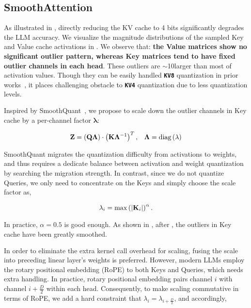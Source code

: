 \subsection{SmoothAttention}
\label{sect:alg:smooth-attention}

As illustrated in , directly reducing the KV cache to 4 bits significantly degrades the LLM accuracy. We visualize the magnitude distributions of the sampled Key and Value cache activations in . We observe that: \textbf{the Value matrices show no significant outlier pattern, whereas Key matrices tend to have fixed outlier channels in each head}. These outliers are  $\sim$10\x larger than most of activation values. Though they can be easily handled \textbf{\texttt{KV8}} quantization in prior works~\cite{xiao2023smoothquant}, it places challenging obstacle to \textbf{\texttt{KV4}} quantization due to less quantization levels.

Inspired by SmoothQuant~\cite{xiao2023smoothquant}, we propose \smoothattention to scale down the outlier channels in Key cache by a per-channel factor $\mathbf{\lambda}$:

\vspace{-10pt}
\begin{equation}
    \small \mathbf{Z} = \left(\mathbf{Q}\mathbf{\Lambda}\right)\cdot \left(\mathbf{K}\mathbf{\Lambda}^{-1}\right)^T,\;\;\;\mathbf{\Lambda}=\mathrm{diag}\left(\mathbf{\lambda}\right)
\end{equation}
\vspace{-15pt}


SmoothQuant migrates the quantization difficulty from activations to weights, and thus requires a dedicate balance between activation and weight quantization by searching the migration strength. In contrast, since we do not quantize Queries, we only need to concentrate on the Keys and simply choose the \smoothattention scale factor as,

\vspace{-10pt}
\begin{equation}
    \small \mathbf{\lambda}_{i} = \max\left(|\mathbf{K}_i|\right)^{\alpha}.
\end{equation}
\vspace{-15pt}

In practice, $\alpha=0.5$ is good enough. As shown in , after \smoothattention, the outliers in Key cache have been greatly smoothed.

In order to eliminate the extra kernel call overhead for \smoothattention scaling, fusing the scale into preceding linear layer's weights is preferred. However, modern LLMs employ the rotary positional embedding (RoPE) to both Keys and Queries, which needs extra handling. In practice, rotary positional embedding pairs channel $i$ with channel $i+\frac{D}{2}$ within each head. Consequently, to make \smoothattention scaling commutative in terms of RoPE, we add a hard constraint that $\lambda_{i} = \lambda_{i + \frac{D}{2}}$, and accordingly,

